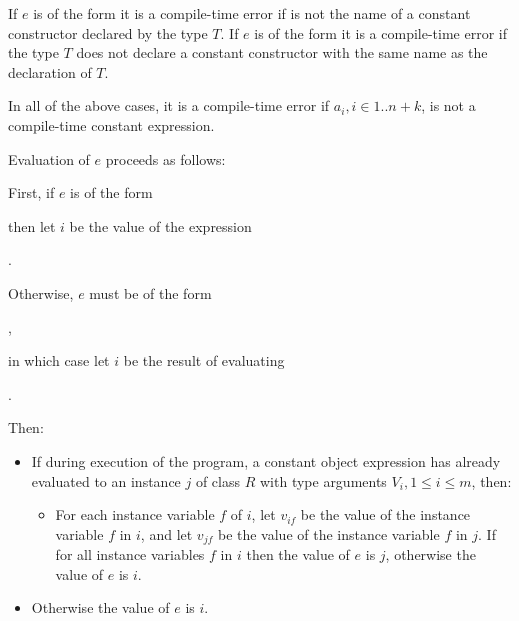 \documentclass{article}
\begin{document}
\LMHash{}
If $e$ is of the form
it is a compile-time error if  is not the name of a constant constructor declared by the type $T$.
If $e$ is of the form
it is a compile-time error if the type $T$ does not declare a constant constructor with the same name as the declaration of $T$.

\LMHash{}
In all of the above cases, it is a compile-time error if $a_i, i\in 1 .. n + k$, is not a compile-time constant expression.


\LMHash{}
Evaluation of $e$ proceeds as follows:

\LMHash{}
First, if $e$ is of the form


then let $i$ be the value of the expression

.

\LMHash{}
Otherwise, $e$ must be of the form

,

in which case let $i$ be the result of evaluating

.

\LMHash{}
Then:
\begin{itemize}
\item If during execution of the program, a constant object expression has already evaluated to an instance $j$ of class $R$ with type arguments $V_i, 1 \le i \le m$, then:
\begin{itemize}
\item For each instance variable $f$ of $i$, let $v_{if}$ be the value of the instance variable $f$ in $i$, and let $v_{jf}$ be the value of the instance variable $f$ in $j$.
  If  for all instance variables $f$ in $i$ then the value of $e$ is $j$, otherwise the value of $e$ is $i$.
\end{itemize}
\item Otherwise the value of $e$ is $i$.
\end{itemize}
\end{document}
